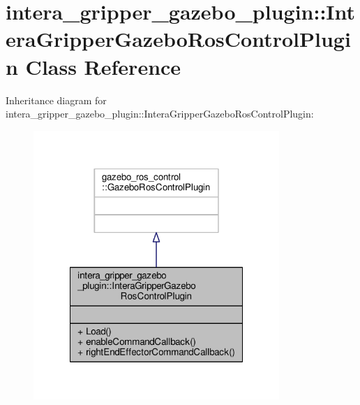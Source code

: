 \hypertarget{classintera__gripper__gazebo__plugin_1_1_intera_gripper_gazebo_ros_control_plugin}{\section{intera\-\_\-gripper\-\_\-gazebo\-\_\-plugin\-:\-:Intera\-Gripper\-Gazebo\-Ros\-Control\-Plugin Class Reference}
\label{classintera__gripper__gazebo__plugin_1_1_intera_gripper_gazebo_ros_control_plugin}
}


Inheritance diagram for intera\-\_\-gripper\-\_\-gazebo\-\_\-plugin\-:\-:Intera\-Gripper\-Gazebo\-Ros\-Control\-Plugin\-:\nopagebreak
\begin{figure}[H]
\begin{center}
\leavevmode
\includegraphics[width=264pt]{classintera__gripper__gazebo__plugin_1_1_intera_gripper_gazebo_ros_control_plugin__inherit__graph}
\end{center}
\end{figure}


